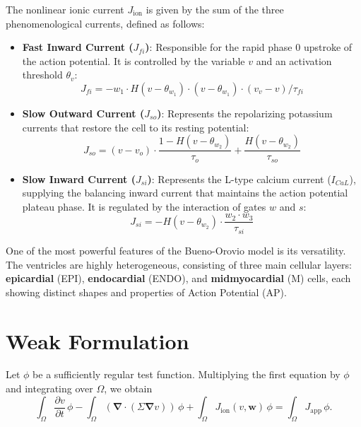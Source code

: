 \documentclass{Configuration_Files/PoliMi3i_thesis}
\begin{document}
The nonlinear ionic current \(J_{\mathrm{ion}}\) is given by the sum of the three phenomenological currents, defined as follows:
\begin{itemize}
  \item \textbf{Fast Inward Current ($J_{fi}$)}: Responsible for the rapid phase 0 upstroke of the action potential. It is controlled by the variable $v$ and an activation threshold $\theta_v$:
\begin{equation}
    J_{fi} = -w_1 \cdot H(v - \theta_{w_1}) \cdot (v - \theta_{w_1}) \cdot (v_v - v)/\tau_{fi}
    \label{eq:placeholder_label}
\end{equation}
  \item \textbf{Slow Outward Current ($J_{so}$)}: Represents the repolarizing potassium currents that restore the cell to its resting potential:
\begin{equation}
    J_{so} = (v - v_o) \cdot \frac{1 - H(v - \theta_{w_2})}{\tau_o} + \frac{H(v - \theta_{w_2})}{\tau_{so}}
    \label{eq:placeholder_label}
\end{equation}
  \item \textbf{Slow Inward Current ($J_{si}$)}: Represents the L-type calcium current ($I_{CaL}$), supplying the balancing inward current that maintains the action potential plateau phase. It is regulated by the interaction of gates $w$ and $s$:
\begin{equation}
    J_{si} = -H(v - \theta_{w_2}) \cdot \frac{w_2 \cdot w_3}{\tau_{si}}
    \label{eq:placeholder_label}
\end{equation}
\end{itemize}
One of the most powerful features of the Bueno-Orovio model is its versatility. The ventricles are highly heterogeneous, consisting of three main cellular layers: \textbf{epicardial} (EPI), \textbf{endocardial} (ENDO), and \textbf{midmyocardial} (M) cells, each showing distinct shapes and properties of Action Potential (AP). 
\newpage
\section{Weak Formulation}

Let $\phi$ be a sufficiently regular test function. Multiplying the first equation by $\phi$ and integrating over $\Omega$, we obtain
\[
\int_\Omega \frac{\partial v}{\partial t}\,\phi
- \int_\Omega (\boldsymbol{\nabla} \cdot (\Sigma \boldsymbol{\nabla} v))\,\phi
+ \int_\Omega J_{\mathrm{ion}}(v,\mathbf{w})\,\phi
=
\int_\Omega J_{\mathrm{app}}\,\phi.
\]
\end{document}

